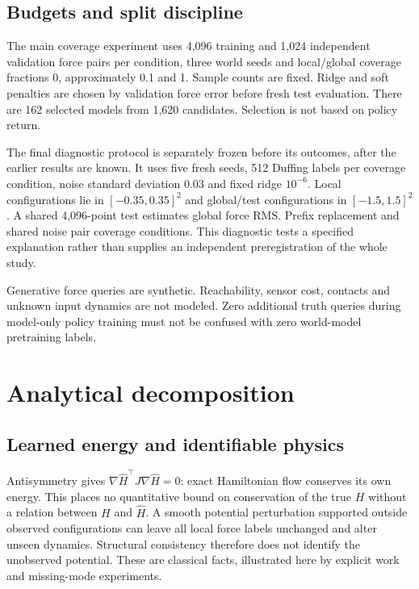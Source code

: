 \documentclass[
  10pt,
]{article}
\begin{document}
\hypertarget{budgets-and-split-discipline}{%
\subsection{Budgets and split
discipline}\label{budgets-and-split-discipline}}

The main coverage experiment uses 4,096 training and 1,024 independent
validation force pairs per condition, three world seeds and local/global
coverage fractions 0, approximately 0.1 and 1. Sample counts are fixed.
Ridge and soft penalties are chosen by validation force error before
fresh test evaluation. There are 162 selected models from 1,620
candidates. Selection is not based on policy return.

The final diagnostic protocol is separately frozen before its outcomes,
after the earlier results are known. It uses five fresh seeds, 512
Duffing labels per coverage condition, noise standard deviation 0.03 and
fixed ridge \(10^{-6}\). Local configurations lie in \([-0.35,0.35]^2\)
and global/test configurations in \([-1.5,1.5]^2\). A shared 4,096-point
test estimates global force RMS. Prefix replacement and shared noise
pair coverage conditions. This diagnostic tests a specified explanation
rather than supplies an independent preregistration of the whole study.

Generative force queries are synthetic. Reachability, sensor cost,
contacts and unknown input dynamics are not modeled. Zero additional
truth queries during model-only policy training must not be confused
with zero world-model pretraining labels.

\hypertarget{analytical-decomposition}{%
\section{Analytical decomposition}\label{analytical-decomposition}}

\hypertarget{learned-energy-and-identifiable-physics}{%
\subsection{Learned energy and identifiable
physics}\label{learned-energy-and-identifiable-physics}}

Antisymmetry gives \(\nabla\widehat H^\top J\nabla\widehat H=0\): exact
Hamiltonian flow conserves its own energy. This places no quantitative
bound on conservation of the true \(H\) without a relation between \(H\)
and \(\widehat H\). A smooth potential perturbation supported outside
observed configurations can leave all local force labels unchanged and
alter unseen dynamics. Structural consistency therefore does not
identify the unobserved potential. These are classical facts,
illustrated here by explicit work and missing-mode experiments.
\end{document}
